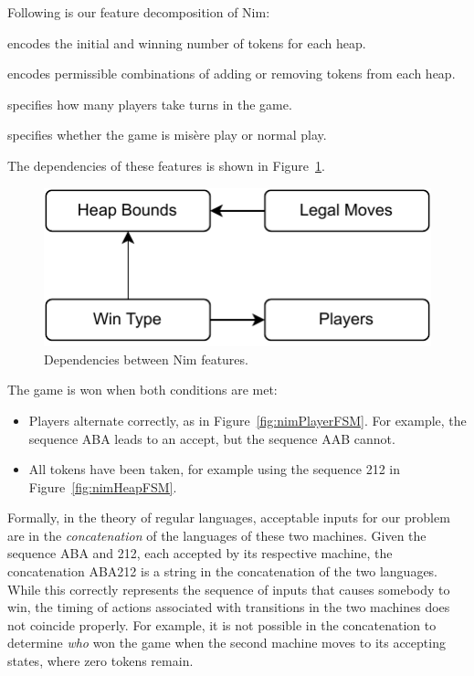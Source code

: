 \documentclass[conference]{IEEEtran}
\begin{document}
Following is our feature decomposition of Nim:
\begin{description}
    \item[Heap Bounds] encodes the initial and winning number of tokens for each heap.
    \item[Legal Moves] encodes permissible combinations of adding or removing tokens from each heap.
    \item[Number of Players] specifies how many players take turns in the game.
    \item[Win Type] specifies whether the game is mis\`{e}re play or normal play.
\end{description}
The dependencies of these features is shown in Figure~\ref{fig:nimDependencies}.  

\begin{figure}
    \centering
    \includegraphics[width=0.6\linewidth]{figures/NimFeatures.pdf}
    \caption{Dependencies between Nim features.}
    \label{fig:nimDependencies}
\end{figure}


The game is won when both conditions are met:
\begin{itemize}
    \item Players alternate correctly, as in Figure~\ref{fig:nimPlayerFSM}.  For example, the sequence ABA leads to an accept, but the sequence AAB cannot.
    \item All tokens have been taken, for example using the sequence 212 in Figure~\ref{fig:nimHeapFSM}.
\end{itemize}
Formally, in the theory of regular languages, acceptable inputs for our problem are in the \emph{concatenation} of the languages of these two machines.   Given the sequence ABA and 212, each accepted by its respective machine, the concatenation ABA212 is a string in the concatenation of the two languages.  While this correctly represents the sequence of inputs that causes somebody to win, the timing of actions associated with transitions in the two machines does not coincide properly.  For example, it is not possible in the concatenation to determine \emph{who} won the game when the second machine moves to its accepting states, where zero tokens remain. 
\end{document}
